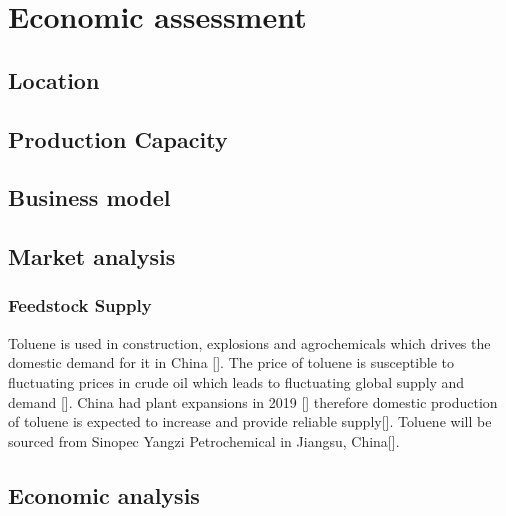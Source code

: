 \section{Economic assessment}
\label{sec:economics}
\subsection{Location} 

\subsection{Production Capacity}


\subsection{Business model} 

\subsection{Market analysis}

\subsubsection{Feedstock Supply}
Toluene is used in construction, explosions and agrochemicals which drives the domestic demand for it in China []. The price of toluene is susceptible to fluctuating prices in crude oil which leads to fluctuating global supply and demand []. China had plant expansions in 2019 [] therefore domestic production of toluene is expected to increase and provide reliable supply[]. Toluene will be sourced from Sinopec Yangzi Petrochemical in Jiangsu, China[].




\subsection{Economic analysis} 
